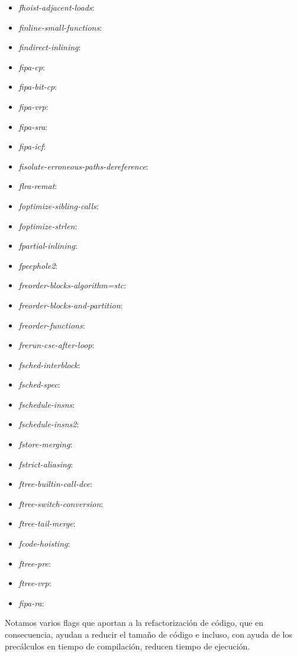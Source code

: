 \begin{itemize}
  \item \textit{fhoist-adjacent-loads}:
	\item \textit{finline-small-functions}:
	\item \textit{findirect-inlining}:
	\item \textit{fipa-cp}:
	\item \textit{fipa-bit-cp}:
	\item \textit{fipa-vrp}:
	\item \textit{fipa-sra}:
	\item \textit{fipa-icf}:
	\item \textit{fisolate-erroneous-paths-dereference}:
	\item \textit{flra-remat}:
	\item \textit{foptimize-sibling-calls}:
	\item \textit{foptimize-strlen}:
	\item \textit{fpartial-inlining}:
	\item \textit{fpeephole2}:
	\item \textit{freorder-blocks-algorithm=stc}:
	\item \textit{freorder-blocks-and-partition}:
	\item \textit{freorder-functions}:
	\item \textit{frerun-cse-after-loop}:
	\item \textit{fsched-interblock}:
	\item \textit{fsched-spec}:
	\item \textit{fschedule-insns}:
	\item \textit{fschedule-insns2}:
	\item \textit{fstore-merging}:
	\item \textit{fstrict-aliasing}:
	\item \textit{ftree-builtin-call-dce}:
	\item \textit{ftree-switch-conversion}:
	\item \textit{ftree-tail-merge}:
	\item \textit{fcode-hoisting}:
	\item \textit{ftree-pre}:
	\item \textit{ftree-vrp}:
	\item \textit{fipa-ra}:
\end{itemize}

Notamos varios flags que aportan a la refactorización de código, que en consecuencia, ayudan a reducir el tamaño de código e incluso, con ayuda de los precálculos en tiempo de compilación, reducen tiempo de ejecución. 

